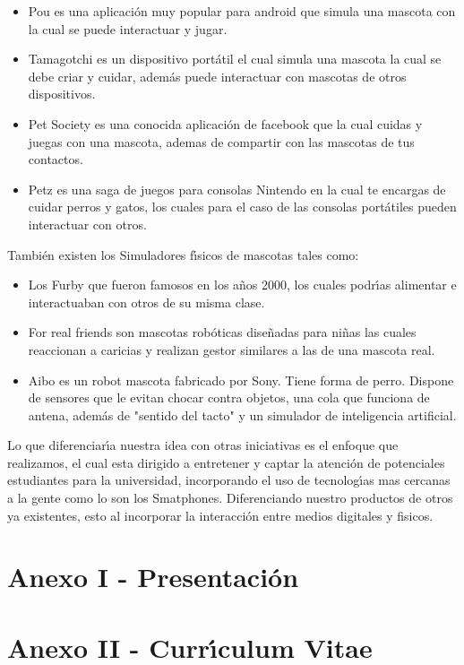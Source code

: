 \documentclass[letterpaper,12pt]{report} %
\numberwithin{equation}{section} %
\numberwithin{figure}{section} %
\numberwithin{table}{section} %
\begin{document}
\begin{itemize}
\item Pou es una aplicaci\'on muy popular para android que simula una mascota con la cual se puede interactuar y jugar. 
\item Tamagotchi es un dispositivo port\'atil el cual simula una mascota la cual se debe criar y cuidar, adem\'as puede interactuar con mascotas de otros dispositivos.  
\item Pet Society es una conocida aplicaci\'on de facebook que la cual cuidas y juegas con una mascota, ademas de compartir con las mascotas de tus contactos. 
\item Petz es una saga de juegos para consolas Nintendo en la cual te encargas de cuidar  perros y gatos, los cuales para el caso de las consolas port\'atiles pueden interactuar con otros.
\end{itemize}
Tambi\'en existen los Simuladores f\'{\i}sicos de mascotas tales como:\\
\begin{itemize}
\item Los Furby que fueron famosos en los a\~nos 2000, los cuales podr\'{\i}as alimentar e interactuaban con otros de su misma clase. 
\item For real friends son mascotas rob\'oticas dise\~nadas para ni\~nas las cuales reaccionan a caricias y realizan gestor similares a las de una mascota real. 
\item Aibo es un robot mascota fabricado por Sony. Tiene forma de perro. Dispone de sensores que le evitan chocar contra objetos,  una cola que funciona de antena, adem\'as de "sentido del tacto" y un simulador de inteligencia artificial.
\end{itemize}
Lo que diferenciar\'{\i}a nuestra idea con otras iniciativas es el enfoque que realizamos, el cual esta dirigido a entretener y captar la atenci\'on de potenciales estudiantes para la universidad,  incorporando el uso de tecnolog\'{\i}as mas cercanas a la gente como lo son los Smatphones. Diferenciando nuestro productos de otros ya existentes, esto al incorporar  la interacci\'on entre medios digitales y fisicos.

\newpage
\chapter*{Anexo I - Presentaci\'on} %

\newpage
\chapter*{Anexo II - Curr\'{\i}culum Vitae} %




\end{document}
